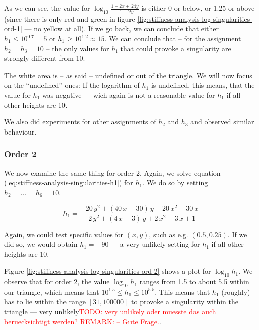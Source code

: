 \documentclass{article}
\newcommand{\todo}[2][]{\textcolor{red}{TODO\ifthenelse{\equal{#1}{}}{}{[#1]}: #2}}
\newcommand{\remark}[2][]{\textcolor{red!70!yellow}{REMARK\ifthenelse{\equal{#1}{}}{}{[#1]}: #2}}
\begin{document}
As we can see, the value for $\log_{10}\frac{1-2x+24y}{-1+2y}$ is either 0 or below, or 1.25 or above (since there is only red and green in figure \ref{fig:stiffness-analysis-log-singularities-ord-1} --- no yellow at all). If we go back, we can conclude that either $h_1 \leq 10^{0.7} = 5$ or $h_1\geq 10^{1.2} \approx 15$. We can conclude that -- for the assignment $h_2=h_3=10$ -- the only values for $h_1$ that could provoke a singularity are strongly different from 10.

The white area is -- as said -- undefined or out of the triangle. We will now focus on the ``undefined'' ones: If the logarithm of $h_1$ is undefined, this means, that the value for $h_1$ was negative --- wich again is not a reasonable value for $h_1$ if all other heights are 10.

We also did experiments for other assignments of $h_2$ and $h_3$ and observed similar behaviour.

\subsubsection{Order 2}
\label{sec:stiffness-analysis-singularities-ord-2}

We now examine the same thing for order 2. Again, we solve equation (\ref{eq:stiffness-analysis-singularities-h1}) for $h_1$. We do so by setting $h_2=\dots=h_6=10$.


\begin{equation*}
  h_1 = -\frac{20\,y^2+\left(40\,x-30\right)\,y+20\,x^2-30\,x}{2\,y^2+
    \left(4\,x-3\right)\,y+2\,x^2-3\,x+1}
\end{equation*}

Again, we could test specific values for $(x,y)$, such as e.g. $(0.5, 0.25)$. If we did so, we would obtain $h_1=-90$ --- a very unlikely setting for $h_1$ if all other heights are 10.

Figure \ref{fig:stiffness-analysis-log-singularities-ord-2} shows a plot for $\log_{10} h_1$. We observe that for order 2, the value $\log_{10} h_1$ ranges from 1.5 to about 5.5 within our triangle, which means that $10^{1.5} \leq h_1 \leq 10^{5.5}$. This means that $h_1$ (roughly) has to lie within the range $\left[ 31, 100000 \right]$ to provoke a singularity within the triangle --- very unlikely\todo{very unlikely oder muesste das auch beruecksichtigt werden? \remark{ -- Gute Frage.}}.
\end{document}
